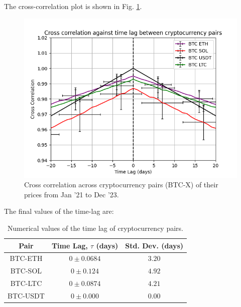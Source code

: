 \documentclass[a4paper, 10pt, conference]{ieeeconf}      %
\begin{document}
The cross-correlation plot is shown in Fig. \ref{crosscorr}.
\begin{figure}
    \centering
    \includegraphics[width = \columnwidth]{Projects/TimeSeriesAnalysis/WrittenReport/plots/cross_correlation_main.png}
    \caption{Cross correlation across cryptocurrency pairs (BTC-X) of their prices from Jan '21 to Dec '23.}
    \label{crosscorr}
\end{figure}
The final values of the time-lag are:\\
\begin{table}[H]
    \centering
        \begin{tabular}{|c|c|c|}
             \hline
             Pair & Time Lag, $\tau$ (days) & Std. Dev. (days) \\
             \hline
             \hline
             BTC-ETH & $0\pm0.0684$ & $3.20$ \\
             \hline
             BTC-SOL & $0\pm0.124$ & $4.92$ \\
             \hline
             BTC-LTC & $0\pm0.0874$ & $4.21$ \\
             \hline
             BTC-USDT & $0\pm0.000$ & $0.00$ \\
             \hline
       \end{tabular}
     \label{tablevalues}
     \caption{Numerical values of the time lag of cryptocurrency pairs.}
\end{table}
\end{document}
